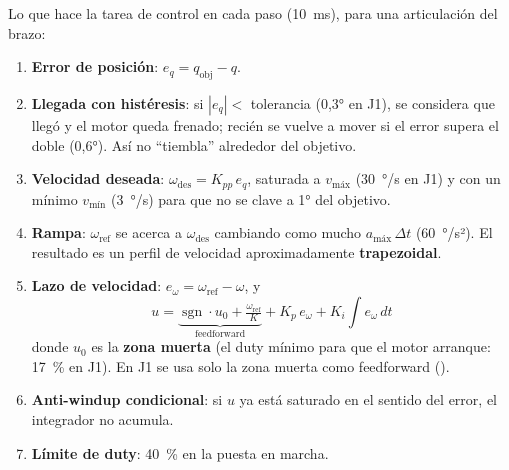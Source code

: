 Lo que hace la tarea de control en cada paso (10~ms), para una articulación del brazo:

\begin{enumerate}
  \item \textbf{Error de posición}: $e_q = q_\text{obj} - q$.
  \item \textbf{Llegada con histéresis}: si $|e_q| < $ tolerancia (0,3° en J1), se considera que llegó y el motor
        queda frenado; recién se vuelve a mover si el error supera el doble (0,6°). Así no ``tiembla'' alrededor
        del objetivo.
  \item \textbf{Velocidad deseada}: $\omega_\text{des} = K_{pp}\, e_q$, saturada a $v_\text{máx}$ (30~°/s en J1) y con
        un mínimo $v_\text{mín}$ (3~°/s) para que no se clave a 1° del objetivo.
  \item \textbf{Rampa}: $\omega_\text{ref}$ se acerca a $\omega_\text{des}$ cambiando como mucho $a_\text{máx}\,\Delta t$
        (60~°/s²). El resultado es un perfil de velocidad aproximadamente \textbf{trapezoidal}.
  \item \textbf{Lazo de velocidad}: $e_\omega = \omega_\text{ref} - \omega$, y
        \[
          u = \underbrace{\operatorname{sgn}\cdot u_0 + \tfrac{\omega_\text{ref}}{K}}_{\text{feedforward}}
              + K_p\, e_\omega + K_i \!\int\! e_\omega\, dt
        \]
        donde $u_0$ es la \textbf{zona muerta} (el duty mínimo para que el motor arranque: 17~\% en J1). En J1 se usa
        solo la zona muerta como feedforward ().
  \item \textbf{Anti-windup condicional}: si $u$ ya está saturado en el sentido del error, el integrador no acumula.
  \item \textbf{Límite de duty}: 40~\% en la puesta en marcha.
\end{enumerate}

